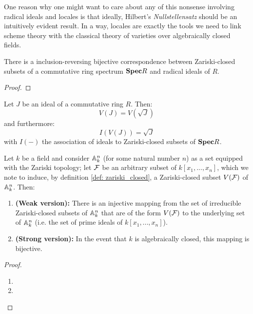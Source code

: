                 One reason why one might want to care about any of this nonsense involving radical ideals and locales is that ideally, Hilbert's \textit{Nullstellensatz} should be an intuitively evident result. In a way, locales are exactly the tools we need to link scheme theory with the classical theory of varieties over algebraically closed fields.
                \begin{lemma} \label{lemma: radical_varieties}
                    There is a inclusion-reversing bijective correspondence between Zariski-closed subsets of a commutative ring spectrum $\mathbf{Spec} R$ and radical ideals of $R$. 
                \end{lemma}
                    \begin{proof}
                        
                    \end{proof}
                \begin{corollary}
                    Let $J$ be an ideal of a commutative ring $R$. Then:
                        $$V\left(J\right) = V\left(\sqrt{J}\right)$$
                    and furthermore:
                        $$I\left(V(J)\right) = \sqrt{J}$$
                    with $I(-)$ the association of ideals to Zariski-closed subsets of $\mathbf{Spec} R$.
                \end{corollary}
                
                \begin{theorem}
                    Let $k$ be a field and consider $\mathbb{A}^n_k$ (for some natural number $n$) as a set equipped with the Zariski topology; let $\mathcal{F}$ be an arbitrary subset of $k[x_1, ..., x_n]$, which we note to induce, by definition \ref{def: zariski_closed}, a Zariski-closed subset $V(\mathcal{F})$ of $\mathbb{A}^n_k$. Then:
                        \begin{enumerate}
                            \item \textbf{(Weak version):} There is an injective mapping from the set of irreducible Zariski-closed subsets of $\mathbb{A}^n_k$ that are of the form $V(\mathcal{F})$ to the underlying set of $\mathbb{A}^n_k$ (i.e. the set of prime ideals of $k[x_1, ..., x_n]$).
                            \item \textbf{(Strong version):} In the event that $k$ is algebraically closed, this mapping is bijective.
                        \end{enumerate}
                \end{theorem}
                    \begin{proof}
                        \noindent
                        \begin{enumerate}
                            \item 
                            \item 
                        \end{enumerate}
                    \end{proof}
        
